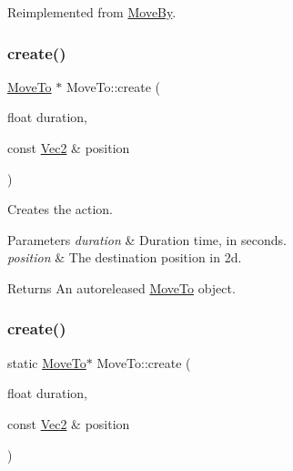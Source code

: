 Reimplemented from \hyperlink{classMoveBy_a56e7a18b9eb4a9c106bac223103f937f}{Move\+By}.

\mbox{\label{classMoveTo_a2a4a53041b9366c24c1b81675658c3bc}} 
\subsubsection{\texorpdfstring{create()}{create()}\hspace{0.1cm}{\footnotesize\ttfamily [1/4]}}
{\footnotesize\ttfamily \hyperlink{classMoveTo}{Move\+To} $\ast$ Move\+To\+::create (\begin{DoxyParamCaption}\item[{float}]{duration,  }\item[{const \hyperlink{classVec2}{Vec2} \&}]{position }\end{DoxyParamCaption})\hspace{0.3cm}{\ttfamily [static]}}

Creates the action. 
\begin{DoxyParams}{Parameters}
{\em duration} & Duration time, in seconds. \\
\hline
{\em position} & The destination position in 2d. \\
\hline
\end{DoxyParams}
\begin{DoxyReturn}{Returns}
An autoreleased \hyperlink{classMoveTo}{Move\+To} object. 
\end{DoxyReturn}
\mbox{\label{classMoveTo_afb7c4cb7967a65745add29e1a7ba0728}} 
\subsubsection{\texorpdfstring{create()}{create()}\hspace{0.1cm}{\footnotesize\ttfamily [2/4]}}
{\footnotesize\ttfamily static \hyperlink{classMoveTo}{Move\+To}$\ast$ Move\+To\+::create (\begin{DoxyParamCaption}\item[{float}]{duration,  }\item[{const \hyperlink{classVec2}{Vec2} \&}]{position }\end{DoxyParamCaption})\hspace{0.3cm}{\ttfamily [static]}}

